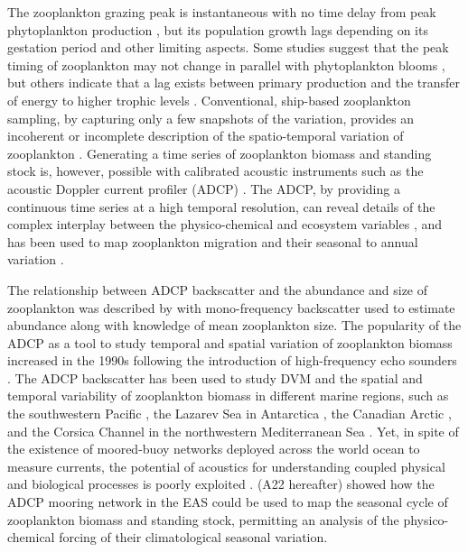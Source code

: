 \documentclass[authoryear,review,11pt]{elsarticle}
\begin{document}
The zooplankton grazing peak is instantaneous with no time delay from peak phytoplankton production \citep{li2000determines,barber2001qn}, but its population growth lags \citep{rehim2012dynamical, almen2020temperature} depending on its gestation period and other limiting aspects. Some studies suggest that the peak timing of zooplankton may not change in parallel with phytoplankton blooms \citep{winder2004climatic}, but others indicate that a lag exists between primary production and the transfer of energy to higher trophic levels \citep{brock1992interannual, brock1991phytoplankton}. Conventional, ship-based zooplankton sampling, by capturing only a few snapshots of the variation, provides an incoherent or incomplete description of the spatio-temporal variation of zooplankton \citep{ramamurthy1965studies, madhupratap1992zooplankton, piontkovski1995spatial, madhupratap1996lack, wishner1998mesozooplankton,nair1999arabian, barber2001qn, jyothibabu2010re, khandagale2022seasonal}. Generating a time series of zooplankton biomass and standing stock is, however, possible with calibrated acoustic instruments such as the acoustic Doppler current profiler (ADCP) \citep{edvardsen2003assessing, smith2005mesozooplankton, smeti2015spatial, kang2024acoustic}.  The ADCP, by providing a continuous time series at a high temporal resolution, can reveal details of the complex interplay between the physico-chemical and ecosystem variables \citep{jiang2007temporal, potiris2018acoustic, shankar2019role, aparna2022seasonal, nie2023influence}, and has been used to map zooplankton migration \citep{inoue2016diel,ursella2018evidence, ursella2021diel} and their seasonal to annual variation \citep{jiang2007temporal,  hobbs2021marine, liu2022seasonal, aparna2022seasonal}.

The relationship between ADCP backscatter and the abundance and size of zooplankton was described by \citet{greenlaw1979acoustical} with mono-frequency backscatter used to estimate abundance along with knowledge of mean zooplankton size. The popularity of the ADCP as a tool to study temporal and spatial variation of zooplankton biomass increased in the 1990s following the introduction of high-frequency echo sounders \citep{flagg1989use, wiebe1990sound, batchelder00981, greene1998three, rippeth1998diur}. The ADCP backscatter has been used to study DVM and the spatial and temporal variability of zooplankton biomass in different marine regions, such as the southwestern Pacific  \citep{smeti2015spatial}, the Lazarev Sea in Antarctica  \citep{cisewski2010seasonal}, the Canadian Arctic  \citep{hamilton2013links}, and the Corsica Channel in the northwestern Mediterranean Sea \citep{guerra2019zooplankton}. Yet, in spite of the existence of moored-buoy networks deployed across the world ocean to measure currents, the potential of acoustics for understanding coupled physical and biological processes is poorly exploited \citep{davis2019100, shankar2019role, aparna2022seasonal}.  \citet{aparna2022seasonal} (A22 hereafter) showed how the ADCP mooring network in the EAS \citep{amol2014observed, chaudhuri2020observed} could be used to map the seasonal cycle of zooplankton biomass and standing stock, permitting an analysis of the physico-chemical forcing of their climatological seasonal variation.
\end{document}

